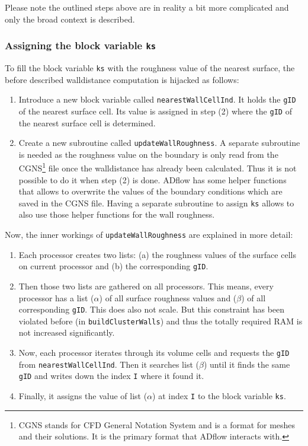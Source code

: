 \noindent Please note the outlined steps above are in reality a bit more
complicated and only the broad context is described.


\subsubsection{Assigning the block variable \texttt{ks}}
To fill the block variable \texttt{ks} with the roughness value of the nearest
surface, the before described walldistance computation is hijacked as follows:

\begin{enumerate}[label=\Alph*]
  \item Introduce a new block variable called \texttt{nearestWallCellInd}. It
holds the \texttt{gID} of the nearest surface cell. Its value is assigned in
step (2) where the \texttt{gID} of the nearest surface cell is determined.

  \item Create a new subroutine called \texttt{updateWallRoughness}. A separate
subroutine is needed as the roughness value on the boundary is only read from
the CGNS\footnote{CGNS stands for CFD General Notation System and is a format
for meshes and their solutions. It is the primary format that ADflow interacts
with.} file once the walldistance has already been calculated. Thus it is not
possible to do it when step (2) is done. ADflow has some helper functions that
allows to overwrite the values of the boundary conditions which are saved in the
CGNS file. Having a separate subroutine to assign \texttt{ks} allows to also use
those helper functions for the wall roughness.
\end{enumerate}

\noindent Now, the inner workings of \texttt{updateWallRoughness} are explained
in more detail:

\begin{enumerate}[label=\Alph*]
  \item Each processor creates two lists: (a) the roughness values of the
surface cells on current processor and (b) the corresponding \texttt{gID}.

  \item Then those two lists are gathered on all processors. This means, every
processor has a list ($\alpha$) of all surface roughness values and ($\beta$) of
all corresponding \texttt{gID}. This does also not scale. But this constraint
has been violated before (in \texttt{buildClusterWalls}) and thus the totally
required RAM is not increased significantly.

\item Now, each processor iterates through its volume cells and requests the
\texttt{gID} from \texttt{nearestWallCellInd}. Then it searches list ($\beta$)
until it finds the same \texttt{gID} and writes down the index \texttt{I} where
it found it.

\item Finally, it assigns the value of list ($\alpha$) at index \texttt{I} to the
block variable \texttt{ks}.
\end{enumerate}

